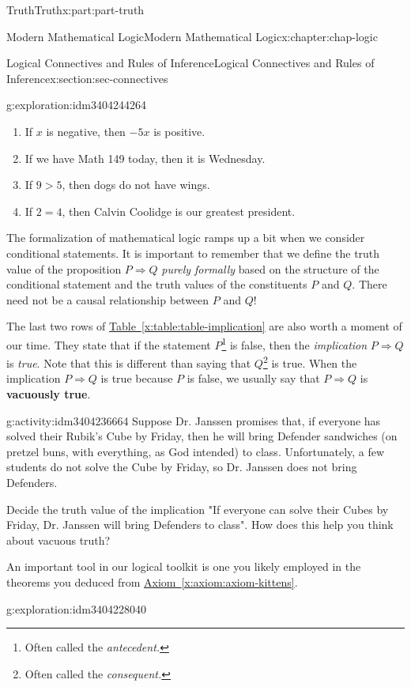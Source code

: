 \documentclass[oneside,10pt,]{book}
\newcommand{\xreffont}{\relax}
\newcommand{\terminology}[1]{\textbf{#1}}
\numberwithin{equation}{section}
\begin{document}
\begin{partptx}{Truth}{}{Truth}{}{}{x:part:part-truth}
\begin{chapterptx}{Modern Mathematical Logic}{}{Modern Mathematical Logic}{}{}{x:chapter:chap-logic}
\begin{sectionptx}{Logical Connectives and Rules of Inference}{}{Logical Connectives and Rules of Inference}{}{}{x:section:sec-connectives}
\begin{exploration}{}{g:exploration:idm3404244264}
%
\begin{enumerate}
\item{}If \(x\) is negative, then \(-5x\) is positive.%
\item{}If we have Math 149 today, then it is Wednesday.%
\item{}If \(9 > 5\), then dogs do not have wings.%
\item{}If \(2=4\), then Calvin Coolidge is our greatest president.%
\end{enumerate}
\end{exploration}%
The formalization of mathematical logic ramps up a bit when we consider conditional statements. It is important to remember that we define the truth value of the proposition \(P \Rightarrow Q\) \emph{purely formally} based on the structure of the conditional statement and the truth values of the constituents \(P\) and \(Q\). There need not be a causal relationship between \(P\) and \(Q\)!%
\par
The last two rows of \hyperref[x:table:table-implication]{Table~{\xreffont\ref{x:table:table-implication}}} are also worth a moment of our time. They state that if the statement \(P\)\footnote{Often called the \emph{antecedent.}\label{g:fn:idm3404235480}} is false, then the \emph{implication} \(P\Rightarrow Q\) is \emph{true}. Note that this is different than saying that \(Q\)\footnote{Often called the \emph{consequent.}\label{g:fn:idm3404233160}} is true. When the implication \(P\Rightarrow Q\) is true because \(P\) is false, we usually say that \(P\Rightarrow Q\) is \terminology{vacuously true}.%
\begin{activity}{}{g:activity:idm3404236664}%
Suppose Dr. Janssen promises that, if everyone has solved their Rubik's Cube by Friday, then he will bring Defender sandwiches (on pretzel buns, with everything, as God intended) to class\footnotemark{}. Unfortunately, a few students do not solve the Cube by Friday, so Dr. Janssen does not bring Defenders.%
\par
Decide the truth value of the implication "If everyone can solve their Cubes by Friday, Dr. Janssen will bring Defenders to class". How does this help you think about vacuous truth?%
\end{activity}%
%
An important tool in our logical toolkit is one you likely employed in the theorems you deduced from \hyperref[x:axiom:axiom-kittens]{Axiom~{\xreffont\ref{x:axiom:axiom-kittens}}}.%
\begin{exploration}{}{g:exploration:idm3404228040}%

\end{exploration}
\end{sectionptx}
\end{chapterptx}
\end{partptx}
\end{document}
